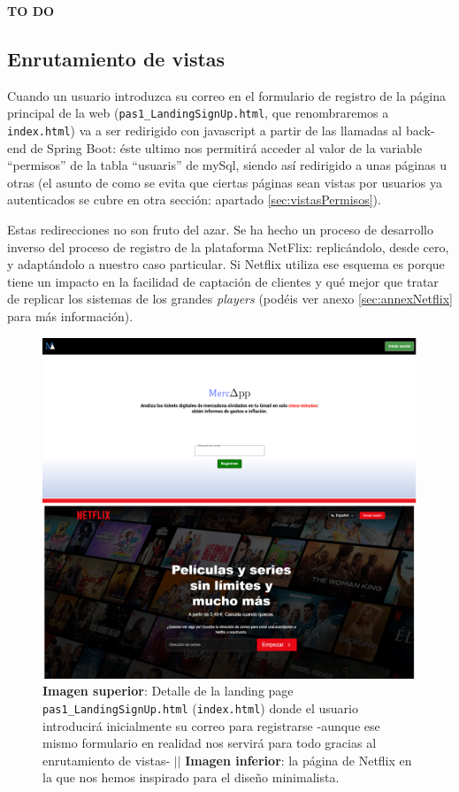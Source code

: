 \documentclass[a4paper,12pt]{report}
\begin{document}
	\textbf{TO DO}
	
	\subsection{Enrutamiento de vistas}
	\label{sec:EnrutamientoDeVistas}
	
	Cuando un usuario introduzca su correo en el formulario de registro de la página principal de la web (\texttt{pas1\_LandingSignUp.html}, que renombraremos a \texttt{index.html}) va a ser redirigido con javascript a partir de las llamadas al back-end de Spring Boot: éste ultimo nos permitirá acceder al valor de la variable ``permisos'' de la tabla ``usuaris'' de mySql, siendo así redirigido a unas páginas u otras (el asunto de como se evita que ciertas páginas sean vistas por usuarios ya autenticados se cubre en otra sección: apartado \ref{sec:vistasPermisos}).
	
	

	
	Estas redirecciones no son fruto del azar. Se ha hecho un proceso de desarrollo inverso del proceso de registro de la plataforma NetFlix: replicándolo, desde cero, y adaptándolo a nuestro caso particular. Si Netflix utiliza ese esquema es porque tiene un impacto en la facilidad de captación de clientes y qué mejor que tratar de replicar los sistemas de los grandes \textit{players} (podéis ver anexo \ref{sec:annexNetflix} para más información).
	
	
	
	\setlength{\belowcaptionskip}{3pt}
	\FloatBarrier
	\begin{figure}[H]
		\centering
		\caption{\textbf{Imagen superior}: Detalle de la landing page \texttt{pas1\_LandingSignUp.html} (\texttt{index.html}) donde el usuario introducirá inicialmente su correo para registrarse -aunque ese mismo formulario en realidad nos servirá para todo gracias al enrutamiento de vistas- $||$ \textbf{Imagen inferior}: la página de Netflix en la que nos hemos inspirado para el diseño minimalista.}
		\includegraphics[width=1\textwidth]{img/landingSignUp.png}

		\label{fig:landingSignUpDETALL} 
	\end{figure}
	\FloatBarrier
	
\end{document}
